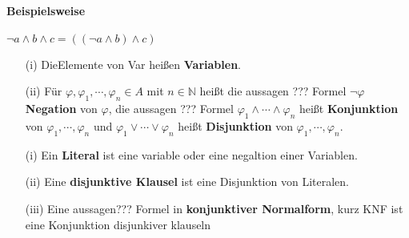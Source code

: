     \paragraph*{Beispielsweise}
        \(\lnot a \wedge b \wedge c = ((\lnot a \wedge b)\wedge c)\)
    
    \begin{itemize}
        \item [(i)]DieElemente von Var heißen \textbf{Variablen}.
        \item [(ii)] Für \(\varphi, \varphi_1, \cdots, \varphi_n \in A\) mit \(n \in \mathbb{N}\) heißt die aussagen ??? Formel \( \lnot \varphi\) \textbf{Negation} von \(\varphi\), die aussagen ??? Formel \(\varphi_1 \wedge \cdots \wedge \varphi_n\) heißt \textbf{Konjunktion} von \(\varphi_1, \cdots, \varphi_n\) und \(\varphi_1 \vee \cdots \vee \varphi_n\) heißt \textbf{Disjunktion} von \(\varphi_1, \cdots, \varphi_n\).
    \end{itemize}

\begin{itemize}
    \item [(i)] Ein \textbf{Literal} ist eine variable oder eine negaltion einer Variablen.
    \item [(ii)] Eine \textbf{disjunktive Klausel} ist eine Disjunktion von Literalen.
    \item [(iii)] Eine aussagen??? Formel in \textbf{konjunktiver Normalform}, kurz KNF ist eine Konjunktion disjunkiver klauseln
\end{itemize}

